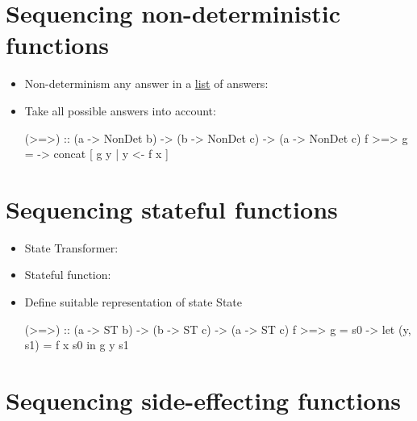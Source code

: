 

\section*{Sequencing non-deterministic functions }

\begin{itemize}
    \item Non-determinism any answer in a \underline{list} of answers:\\
    \item Take all possible answers into account:\\
\begin{codebox}[haskell]
(>=>) :: (a -> NonDet b) -> (b -> NonDet c) -> (a -> NonDet c)
f >=> g = \x -> concat [ g y | y <- f x ]
\end{codebox}
\end{itemize}


\section*{Sequencing stateful functions }

\begin{itemize}
    \item State Transformer: 
    \item Stateful function: 
    \item Define suitable representation of state State
\begin{codebox}[haskell]
(>=>) :: (a -> ST b) -> (b -> ST c) -> (a -> ST c)
f >=> g = \x s0 -> let (y, s1) = f x s0
                   in g y s1
\end{codebox}
\end{itemize}





\section*{Sequencing side-effecting functions }

